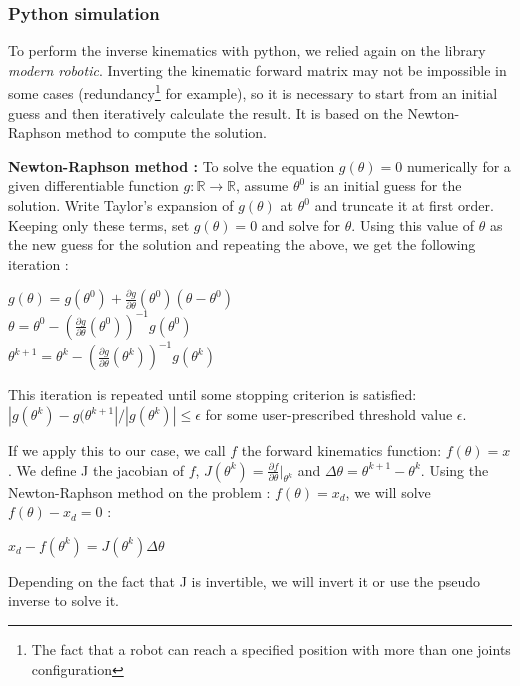 \subsubsection{Python simulation}

To perform the inverse kinematics with python, we relied again on the library \textit{modern robotic}. Inverting the kinematic forward matrix may not be impossible in some cases (\gls{redundancy}\footnote{The fact that a robot can reach a specified position with more than one joints configuration} for example), so it is necessary to start from an initial guess and then iteratively calculate the result. It is based on the Newton-Raphson method to compute the solution. 

\bigbreak
\textbf{Newton-Raphson method :} To solve the equation $g(\theta)=0$ numerically for a given differentiable function $g:\mathbb{R}\rightarrow\mathbb{R}$, assume $\theta^0$ is an initial guess for the solution. Write Taylor's expansion of $g(\theta)$ at $\theta^0$ and truncate it at first order. Keeping only these terms, set $g(\theta)=0$ and solve for $\theta$. Using this value of $\theta$ as the new guess for the solution and repeating the above, we get the following iteration : 
\begin{center}
    $g(\theta) = g(\theta^0)+\displaystyle{\frac{\partial g}{\partial\theta}(\theta^0)(\theta-\theta^0)}$\\
    $\theta = \theta^0-\displaystyle{(\frac{\partial g}{\partial\theta}(\theta^0))^{-1}g(\theta^0)}$\\
    $\theta^{k+1} = \theta^k-\displaystyle{(\frac{\partial g}{\partial\theta}(\theta^k))^{-1}g(\theta^k)}$
\end{center}
 This iteration is repeated until some stopping criterion is satisfied: $|g(\theta^k)-g(\theta^{k+1}|/|g(\theta^k)|\leq\epsilon$ for some user-prescribed threshold value $\epsilon$.
 
 \bigbreak
 If we apply this to our case, we call $f$ the forward kinematics function: $f(\theta) = x$. We define J the jacobian of $f$, $J(\theta^k)= \displaystyle{\frac{\partial f}{\partial\theta}|_{\theta^k}}$ and $\Delta\theta = \theta^{k+1}-\theta^k$. Using the Newton-Raphson method on the problem : $f(\theta)=x_d$, we will solve $f(\theta)-x_d=0$ :
 \begin{center}
     $x_d-f(\theta^k)=J(\theta^k)\Delta\theta$
 \end{center}
 Depending on the fact that J is invertible, we will invert it or use the pseudo inverse to solve it. 
 
